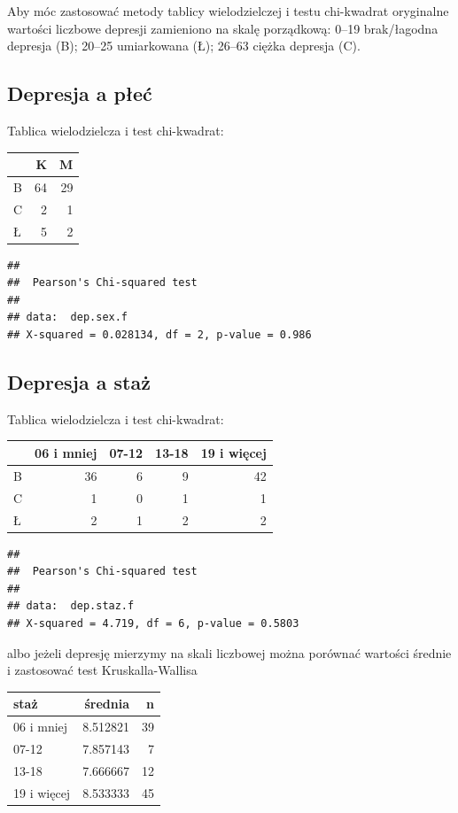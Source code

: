 \documentclass[
  openany]{book}
\begin{document}
Aby móc zastosować metody tablicy wielodzielczej i testu chi-kwadrat
oryginalne wartości liczbowe depresji zamieniono
na skalę porządkową: 0--19 brak/łagodna depresja (B);
20--25 umiarkowana (Ł); 26--63 ciężka depresja (C).

\hypertarget{depresja-a-pux142eux107}{%
\subsection{Depresja a płeć}\label{depresja-a-pux142eux107}}

Tablica wielodzielcza i test chi-kwadrat:

\begin{tabular}{l|r|r}
\hline
  & K & M\\
\hline
B & 64 & 29\\
\hline
C & 2 & 1\\
\hline
Ł & 5 & 2\\
\hline
\end{tabular}

\begin{verbatim}
## 
##  Pearson's Chi-squared test
## 
## data:  dep.sex.f
## X-squared = 0.028134, df = 2, p-value = 0.986
\end{verbatim}

\hypertarget{depresja-a-staux17c}{%
\subsection{Depresja a staż}\label{depresja-a-staux17c}}

Tablica wielodzielcza i test chi-kwadrat:

\begin{tabular}{l|r|r|r|r}
\hline
  & 06 i mniej & 07-12 & 13-18 & 19 i więcej\\
\hline
B & 36 & 6 & 9 & 42\\
\hline
C & 1 & 0 & 1 & 1\\
\hline
Ł & 2 & 1 & 2 & 2\\
\hline
\end{tabular}

\begin{verbatim}
## 
##  Pearson's Chi-squared test
## 
## data:  dep.staz.f
## X-squared = 4.719, df = 6, p-value = 0.5803
\end{verbatim}

albo jeżeli depresję mierzymy na skali liczbowej
można porównać wartości średnie i zastosować test Kruskalla-Wallisa

\begin{tabular}{l|r|r}
\hline
staż & średnia & n\\
\hline
06 i mniej & 8.512821 & 39\\
\hline
07-12 & 7.857143 & 7\\
\hline
13-18 & 7.666667 & 12\\
\hline
19 i więcej & 8.533333 & 45\\
\hline
\end{tabular}
\end{document}
